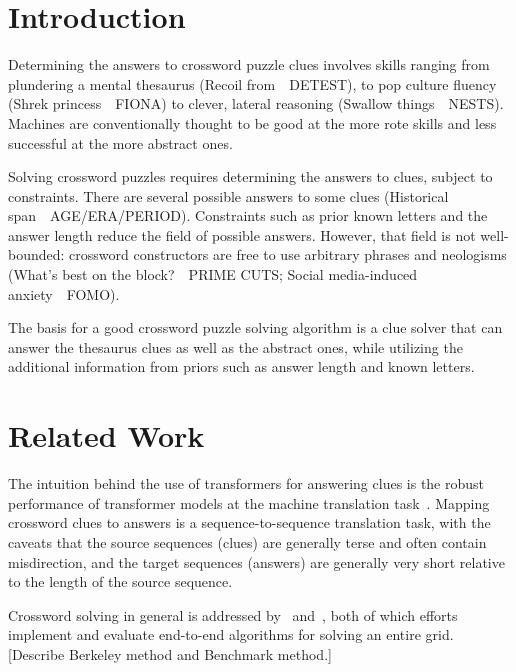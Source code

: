 \documentclass[letterpaper]{article} %
\begin{document}
\begin{NoHyper}

\section{Introduction}
\label{sec:intro}

Determining the answers to crossword puzzle clues involves skills ranging from plundering a mental thesaurus (Recoil from~\textrightarrow~DETEST), to pop culture fluency (Shrek princess~\textrightarrow~FIONA) to clever, lateral reasoning (Swallow things~\textrightarrow~NESTS). Machines are conventionally thought to be good at the more rote skills and less successful at the more abstract ones.

Solving crossword puzzles requires determining the answers to clues, subject to constraints. There are several possible answers to some clues (Historical span~\textrightarrow~AGE/ERA/PERIOD). Constraints such as prior known letters and the answer length reduce the field of possible answers. However, that field is not well-bounded: crossword constructors are free to use arbitrary phrases and neologisms (What's best on the block?~\textrightarrow~PRIME CUTS; Social media-induced anxiety~\textrightarrow~FOMO).

The basis for a good crossword puzzle solving algorithm is a clue solver that can answer the thesaurus clues as well as the abstract ones, while utilizing the additional information from priors such as answer length and known letters.

\section{Related Work}
\label{sec:related}

The intuition behind the use of transformers for answering clues is the robust performance of transformer models at the machine translation task~\cite{vaswani2017}. Mapping crossword clues to answers is a sequence-to-sequence translation task, with the caveats that the source sequences (clues) are generally terse and often contain misdirection, and the target sequences (answers) are generally very short relative to the length of the source sequence.

Crossword solving in general is addressed by~\citealp{kulshreshtha2022across} and~\citealp{wallace2022automated}, both of which efforts implement and evaluate end-to-end algorithms for solving an entire grid. [Describe Berkeley method and Benchmark method.]


\end{NoHyper}
\end{document}
